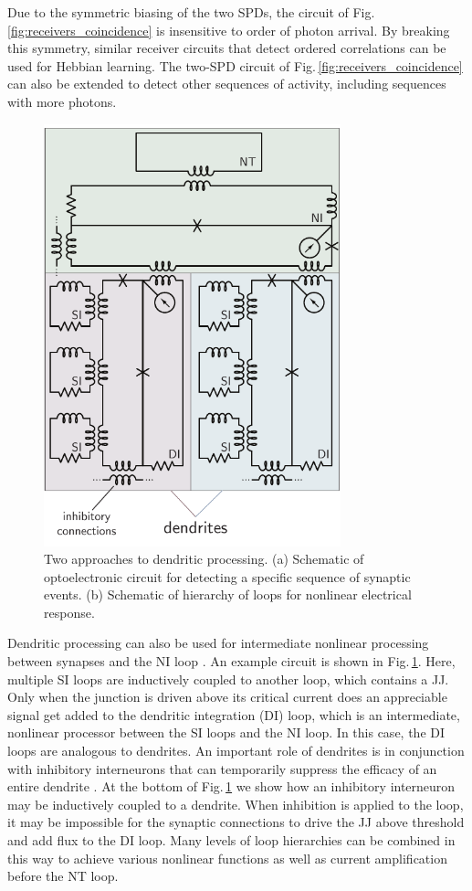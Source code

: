 \documentclass[twocolumn]{article}
\begin{document}
Due to the symmetric biasing of the two SPDs, the circuit of Fig.\,\ref{fig:receivers_coincidence} is insensitive to order of photon arrival. By breaking this symmetry, similar receiver circuits that detect ordered correlations can be used for Hebbian learning. The two-SPD circuit of Fig.\,\ref{fig:receivers_coincidence} can also be extended to detect other sequences of activity, including sequences with more photons. 
\begin{figure}[t!]
	\centerline{\includegraphics[width=8.6cm]{_receivers_dendriticProcessing_small.pdf}}
	\caption{\label{fig:receivers_dendriticProcessing} Two approaches to dendritic processing. (a) Schematic of optoelectronic circuit for detecting a specific sequence of synaptic events. (b) Schematic of hierarchy of loops for nonlinear electrical response.}
\end{figure}

Dendritic processing can also be used for intermediate nonlinear processing between synapses and the NI loop \cite{sava2017}. An example circuit is shown in Fig.\,\ref{fig:receivers_dendriticProcessing}. Here, multiple SI loops are inductively coupled to another loop, which contains a JJ. Only when the junction is driven above its critical current does an appreciable signal get added to the dendritic integration (DI) loop, which is an intermediate, nonlinear processor between the SI loops and the NI loop. In this case, the DI loops are analogous to dendrites. An important role of dendrites is in conjunction with inhibitory interneurons that can temporarily suppress the efficacy of an entire dendrite \cite{budr2004,bu2006,robu2015}. At the bottom of Fig.\,\ref{fig:receivers_dendriticProcessing} we show how an inhibitory interneuron may be inductively coupled to a dendrite. When inhibition is applied to the loop, it may be impossible for the synaptic connections to drive the JJ above threshold and add flux to the DI loop. Many levels of loop hierarchies can be combined in this way to achieve various nonlinear functions as well as current amplification before the NT loop.
\end{document}
